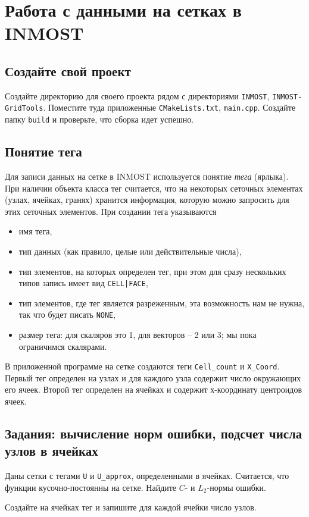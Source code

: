 \documentclass[a4paper, 11pt]{article}
\begin{document}
\section{Работа с данными на сетках в INMOST}

\subsection{Создайте свой проект}
Создайте директорию для своего проекта рядом с директориями \texttt{INMOST}, \texttt{INMOST-GridTools}. Поместите туда приложенные \texttt{CMakeLists.txt}, \texttt{main.cpp}. Создайте папку \texttt{build} и проверьте, что сборка идет успешно.

\subsection{Понятие тега}
Для записи данных на сетке в INMOST используется понятие \textit{тега} (ярлыка). При наличии объекта класса тег считается, что на некоторых сеточных элементах (узлах, ячейках, гранях) хранится информация, которую можно запросить для этих сеточных элементов. При создании тега указываются
\begin{itemize}
	\item имя тега,
	\item тип данных (как правило, целые или действительные числа),
	\item тип элементов, на которых определен тег, при этом для сразу нескольких типов запись имеет вид \texttt{CELL|FACE},
	\item тип элементов, где тег является разреженным, эта возможность нам не нужна, так что будет писать \texttt{NONE},
	\item размер тега: для скаляров это 1, для векторов -- 2 или 3; мы пока ограничимся скалярами.
\end{itemize} 

В приложенной программе на сетке создаются теги \texttt{Cell\_count} и \texttt{X\_Coord}. Первый тег определен на узлах и для каждого узла содержит число окружающих его ячеек. Второй тег определен на ячейках и содержит х-координату центроидов ячеек.

\subsection{Задания: вычисление норм ошибки, подсчет числа узлов в ячейках}
Даны сетки с тегами \texttt{U} и \texttt{U\_approx}, определенными в ячейках. Считается, что функции кусочно-постоянны на сетке. Найдите $C$- и $L_2$-нормы ошибки.

Создайте на ячейках тег и запишите для каждой ячейки число узлов.
\end{document}
